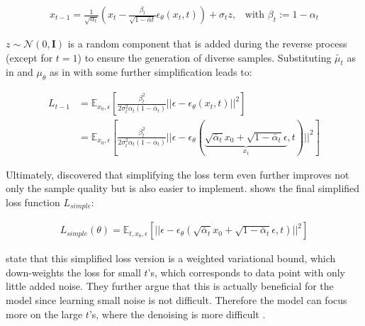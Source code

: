 \begin{equation}
  \begin{align*}
    \label{eqn:xt-1}
    x_{t-1} = \frac{1}{\sqrt{\alpha_t}}\left(x_t - \frac{\beta_t}{\sqrt{1-\bar{\alpha}t}}\epsilon_{\theta}(x_t,t)\right) + \sigma_t z \textrm{,}\quad
    \textrm{with } \beta_t := 1-\alpha_t
  \end{align*}
\end{equation}

\noindent $z\sim\mathcal{N}(0,\textbf{I})$ is a random component that is added during the reverse process (except for $t=1$) to ensure the generation of diverse samples.
\newpage
Substituting $\tilde{\mu_t}$ as in  and $\mu_\theta$ as in  with some further simplification leads to:

\begin{equation}
  \begin{align*}
    \label{eqn:eqn:lt-1_4}
    L_{t-1} &= \mathbb{E}_{x_0,\epsilon} \left[  \frac{\beta^2_t}{2\sigma_t^2 \alpha_t (1-\bar{\alpha}_t)} ||\epsilon - \epsilon_\theta(x_t,t)||^2 \right] \\
    &= \mathbb{E}_{x_0,\epsilon} \left[  \frac{\beta^2_t}{2\sigma_t^2 \alpha_t (1-\bar{\alpha}_t)} ||\epsilon - \epsilon_\theta( \underbrace{\sqrt{\bar{\alpha}_t} x_0 + \sqrt{1-\bar{\alpha}_t}\epsilon}_{x_t}, t)||^2 \right]
  \end{align*}
\end{equation}

Ultimately, \textcite[p. 5]{ho2020DenoisingDiffusionProbabilistic} discovered that simplifying the loss term even further improves not only the sample quality but is also easier to implement.
 shows the final simplified loss function $L_{simple}$:

\begin{equation}
  \begin{align*}
    \label{eqn:l_simple}
    L_{simple}(\theta) = \mathbb{E}_{t, x_0,\epsilon} \left[ ||\epsilon - \epsilon_\theta( \sqrt{\bar{\alpha}_t} x_0 + \sqrt{1-\bar{\alpha}_t}\epsilon, t)||^2 \right]
  \end{align*}
\end{equation}

\textcite{ho2020DenoisingDiffusionProbabilistic} state that this simplified loss version is a weighted variational bound, which down-weights the loss for small $t$'s, which corresponds to data point with only little added noise.
They further argue that this is actually beneficial for the \gls{model} since learning small noise is not difficult. 
Therefore the \gls{model} can focus more on the large $t$'s, where the denoising is more difficult \cite{ho2020DenoisingDiffusionProbabilistic}.

